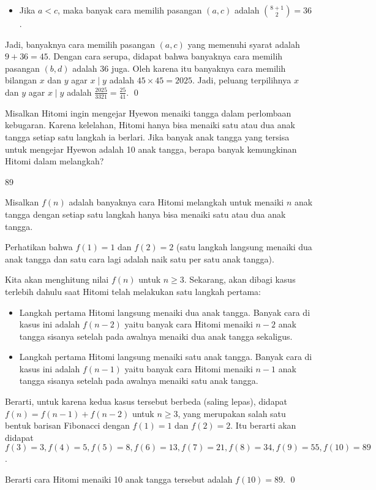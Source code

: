 \documentclass[11pt]{scrartcl}
\begin{document}
\begin{soalbaru}
\begin{solusi}
\begin{itemize}
		\item Jika $a < c$, maka banyak cara memilih pasangan $(a,c)$ adalah ${8+1 \choose 2} = 36$.
		\end{itemize}
		
		Jadi, banyaknya cara memilih pasangan $(a,c)$ yang memenuhi syarat adalah $9+36=45$. Dengan cara serupa, didapat bahwa banyaknya cara memilih pasangan $(b,d)$ adalah 36 juga. Oleh karena itu banyaknya cara memilih bilangan $x$ dan $y$ agar $x \mid y$ adalah $45 \times 45 = 2025$. Jadi, peluang terpilihnya $x$ dan $y$ agar $x \mid y$ adalah $\frac{2025}{3321}=\frac{25}{41}$. \qed
		\end{solusi}
	\end{soalbaru}
	
	\begin{soalbaru}
		Misalkan Hitomi ingin mengejar Hyewon menaiki tangga dalam perlombaan kebugaran. Karena kelelahan, Hitomi hanya bisa menaiki satu atau dua anak tangga setiap satu langkah ia berlari. Jika banyak anak tangga yang tersisa untuk mengejar Hyewon adalah 10 anak tangga, berapa banyak kemungkinan Hitomi dalam melangkah?
		
		\begin{jawaban}
		89
		\end{jawaban}
		\begin{solusi}
		Misalkan $f(n)$ adalah banyaknya cara Hitomi melangkah untuk menaiki $n$ anak tangga dengan setiap satu langkah hanya bisa menaiki satu atau dua anak tangga.
		
		Perhatikan bahwa $f(1)=1$ dan $f(2)=2$ (satu langkah langsung menaiki dua anak tangga dan satu cara lagi adalah naik satu per satu anak tangga).
		
		Kita akan menghitung nilai $f(n)$ untuk $n \ge 3$. Sekarang, akan dibagi kasus terlebih dahulu saat Hitomi telah melakukan satu langkah pertama:
		\begin{itemize}
		\item Langkah pertama Hitomi langsung menaiki dua anak tangga. Banyak cara di kasus ini adalah $f(n-2)$ yaitu banyak cara Hitomi menaiki $n-2$ anak tangga sisanya setelah pada awalnya menaiki dua anak tangga sekaligus.
		
		\item Langkah pertama Hitomi langsung menaiki satu anak tangga. Banyak cara di kasus ini adalah $f(n-1)$ yaitu banyak cara Hitomi menaiki $n-1$ anak tangga sisanya setelah pada awalnya menaiki satu anak tangga.
		\end{itemize}
		
		Berarti, untuk karena kedua kasus tersebut berbeda (saling lepas), didapat $f(n)=f(n-1)+f(n-2)$ untuk $n \ge 3$, yang merupakan salah satu bentuk barisan Fibonacci dengan $f(1)=1$ dan $f(2)=2$. Itu berarti akan didapat $f(3)=3,f(4)=5,f(5)=8,f(6)=13,f(7)=21,f(8)=34,f(9)=55,f(10)=89$.
		
		Berarti cara Hitomi menaiki 10 anak tangga tersebut adalah $f(10)=89$. \qed
		\end{solusi}
	\end{soalbaru}
	
\end{document}
